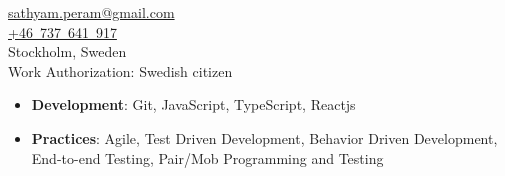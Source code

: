 
\begin{minipage}[t]{0.29\textwidth} %
\colorbox{cvblue!90}{\begin{minipage}[t][5mm][t]{\textwidth}\null\hfill\null\end{minipage}}

\vspace{-0.3ex} %
\colorbox{cvblue!90}
{\color{white}  %
    \textwidth\relax%

    \begin{minipage}[t][293mm][t]{0.82\textwidth}
    \raggedright
    \vspace*{2.5ex}




    \Large
    \vspace*{0.5ex} %
    \href{mailto:sathyam.peram@gmail.com}{\color{sidebarlinkcolor}sathyam.peram@gmail.com} \\
    \href{tel:+46737641917}{\color{sidebarlinkcolor}+46~737~641~917} \\
    Stockholm, Sweden \\
    \vspace{0.5em}
    Work Authorization: Swedish citizen

    \Large
    \Large
    \begin{itemize}
    \setlength{\itemsep}{0.2em}
        \item \textbf{Development}: Git, JavaScript, TypeScript, Reactjs
        \item \textbf{Practices}: Agile, Test Driven Development, Behavior Driven Development, End-to-end Testing, Pair/Mob Programming and Testing
    \end{itemize}


\end{minipage}}
\end{minipage}
